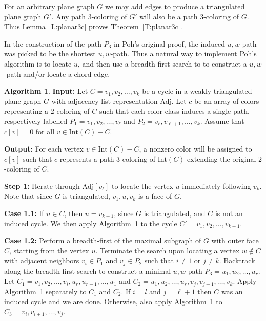 \documentclass[12pt,letterpaper]{article}
\theoremstyle{plain}
\theoremstyle{definition}
\theoremstyle{break}
\newtheorem{algorithm}[lemma]{Algorithm}     %
\begin{document}
For an arbitrary plane graph $G$ we may add edges
to produce a triangulated plane graph $G'$. Any path $3$-coloring of
$G'$ will also be a path $3$-coloring of $G$. Thus Lemma~\ref{L:planar3c}
proves Theorem~\ref{T:planar3c}.

In the construction of the path $P_3$ in Poh's original proof, the
induced $u,w$-path was picked to be the shortest $u,w$-path.
Thus a natural way to implement Poh's algorithm is to locate $u$,
and then use a breadth-first search to
to construct a $u,w$-path and/or locate
a chord edge.

\begin{algorithm}\label{A:poh_bfs}
\textbf{Input:} Let $C=v_1,v_2,\ldots,v_k$ be a cycle in a weakly triangulated plane
graph $G$ with adjacency list representation $\text{Adj}$. Let 
$c$ be an array of colors representing a $2$-coloring of $C$ such
that each color class induces a single path, respectively labelled
$P_1=v_1,v_2,\ldots,v_\ell$ and $P_2=v_\ell,v_{\ell+1},\ldots,v_k$. Assume that
$c[v]=0$ for all $v\in\text{Int}(C)-C$.

\textbf{Output:} For each vertex $v\in\text{Int}(C)-C$, a nonzero color will be
assigned to $c[v]$ such that $c$ represents a path $3$-coloring of
$\text{Int}(C)$ extending the original $2$-coloring of $C$.

\textbf{Step 1:} Iterate through $\text{Adj}[v_\ell]$ to locate the vertex $u$
immediately following $v_k$. Note that since $G$ is triangulated, $v_1,u,v_k$ is
a face of $G$.

\textbf{Case 1.1:} If $u\in C$, then $u=v_{k-1}$, since $G$ is
triangulated, and $C$ is not an induced cycle. We then
apply Algorithm~\ref{A:poh_bfs} to the cycle $C'=v_1,v_2,\ldots,v_{k-1}$.

\textbf{Case 1.2:} Perform a breadth-first of the maximal subgraph of
$G$ with outer face $C$, starting from the
vertex $u$. Terminate the search upon locating a vertex $w\not\in C$ with adjacent
neighbors $v_i\in P_1$ and $v_j\in P_2$ such that $i\ne 1$ or $j\ne k$.
Backtrack along the breadth-first search
to construct a minimal $u,w$-path $P_3=u_1,u_2,\ldots,u_r$. Let
$C_1=v_1,v_2,\ldots,v_i,u_r,u_{r-1},\ldots,u_1$ and
$C_2=u_1,u_2,\ldots,u_r,v_j,v_{j-1},\ldots,v_k$. Apply Algorithm~\ref{A:poh_bfs}
separately to $C_1$ and $C_2$. If $i=l$ and $j={\ell+1}$ then $C$ was an induced
cycle and we are done. Otherwise, also apply Algorithm~\ref{A:poh_bfs} to
$C_3=v_i,v_{i+1},\ldots,v_j$.
\end{algorithm}
\end{document}
